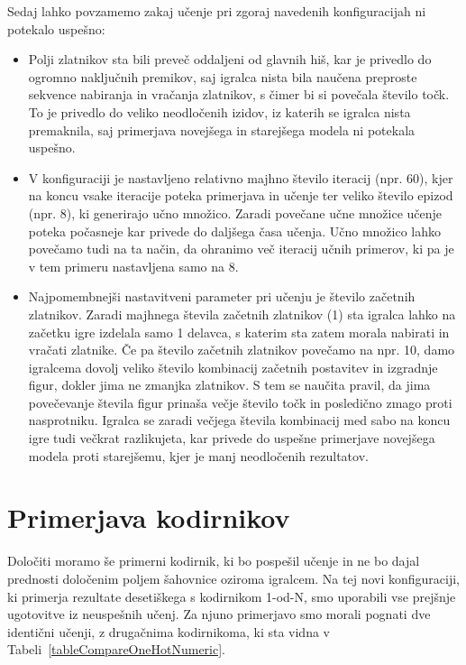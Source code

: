 \documentclass[a4paper, 12pt]{book}
\begin{document}
{%
Sedaj lahko povzamemo zakaj učenje pri zgoraj navedenih konfiguracijah ni potekalo uspešno:
\begin{itemize}
	\item Polji zlatnikov sta bili preveč oddaljeni od glavnih hiš, kar je privedlo do ogromno naključnih premikov, saj igralca nista bila naučena preproste sekvence nabiranja in vračanja zlatnikov, s čimer bi si povečala število točk.
	To je privedlo do veliko neodločenih izidov, iz katerih se igralca nista premaknila, saj primerjava novejšega in starejšega modela ni potekala uspešno.
	\item V konfiguraciji je nastavljeno relativno majhno število iteracij (npr. 60), kjer na koncu vsake iteracije poteka primerjava in učenje ter veliko število epizod (npr. 8), ki generirajo učno množico.
	Zaradi povečane učne množice učenje poteka počasneje kar privede do daljšega časa učenja. Učno množico lahko povečamo tudi na ta način, da ohranimo več iteracij učnih primerov, ki pa je v tem primeru nastavljena samo na 8.	
	\item Najpomembnejši nastavitveni parameter pri učenju je število začetnih zlatnikov.
	Zaradi majhnega števila začetnih zlatnikov (1) sta igralca lahko na začetku igre izdelala samo 1 delavca, s katerim sta zatem morala nabirati in vračati zlatnike.
	Če pa število začetnih zlatnikov povečamo na npr. 10, damo igralcema dovolj veliko število kombinacij začetnih postavitev in izgradnje figur, dokler jima ne zmanjka zlatnikov.
	S tem se naučita pravil, da jima povečevanje števila figur prinaša večje število točk in posledično zmago proti nasprotniku.
	Igralca se zaradi večjega števila kombinacij med sabo na koncu igre tudi večkrat razlikujeta, kar privede do uspešne primerjave novejšega modela proti starejšemu, kjer je manj neodločenih rezultatov.
\end{itemize}

\section{Primerjava kodirnikov}

Določiti moramo še primerni kodirnik, ki bo pospešil učenje in ne bo dajal prednosti določenim poljem šahovnice oziroma igralcem.
Na tej novi konfiguraciji, ki primerja rezultate desetiškega s kodirnikom 1-od-N, smo uporabili vse prejšnje ugotovitve iz neuspešnih učenj.
Za njuno primerjavo smo morali pognati dve identični učenji, z drugačnima kodirnikoma, ki sta vidna v Tabeli~\ref{tableCompareOneHotNumeric}.

}
\end{document}

